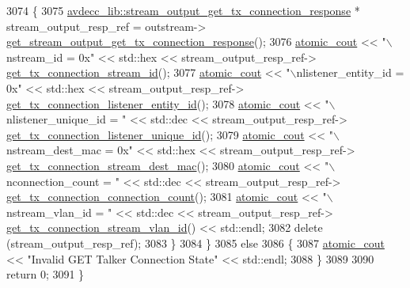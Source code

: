 \begin{DoxyCode}
3074         \{
3075             \hyperlink{classavdecc__lib_1_1stream__output__get__tx__connection__response}{avdecc\_lib::stream\_output\_get\_tx\_connection\_response}
       * stream\_output\_resp\_ref = outstream->
      \hyperlink{classavdecc__lib_1_1stream__output__descriptor_a802183ad18a965dc8540b3053ea875d4}{get\_stream\_output\_get\_tx\_connection\_response}();
3076             \hyperlink{cmd__line_8h_a0bc38ccc65c79ba06c6fcd7b4bf554c3}{atomic\_cout} << \textcolor{stringliteral}{"\(\backslash\)nstream\_id = 0x"} << std::hex << stream\_output\_resp\_ref->
      \hyperlink{classavdecc__lib_1_1stream__output__get__tx__connection__response_a41e8408f2d3675cf07e20f804cacbd4e}{get\_tx\_connection\_stream\_id}();
3077             \hyperlink{cmd__line_8h_a0bc38ccc65c79ba06c6fcd7b4bf554c3}{atomic\_cout} << \textcolor{stringliteral}{"\(\backslash\)nlistener\_entity\_id = 0x"} << std::hex << stream\_output\_resp\_ref->
      \hyperlink{classavdecc__lib_1_1stream__output__get__tx__connection__response_a01f0b3e593ca155a3312254e18123218}{get\_tx\_connection\_listener\_entity\_id}();
3078             \hyperlink{cmd__line_8h_a0bc38ccc65c79ba06c6fcd7b4bf554c3}{atomic\_cout} << \textcolor{stringliteral}{"\(\backslash\)nlistener\_unique\_id = "} << std::dec << stream\_output\_resp\_ref->
      \hyperlink{classavdecc__lib_1_1stream__output__get__tx__connection__response_a2f904ba7079c467dd2cbb6351d972a2e}{get\_tx\_connection\_listener\_unique\_id}();
3079             \hyperlink{cmd__line_8h_a0bc38ccc65c79ba06c6fcd7b4bf554c3}{atomic\_cout} << \textcolor{stringliteral}{"\(\backslash\)nstream\_dest\_mac = 0x"} << std::hex << stream\_output\_resp\_ref->
      \hyperlink{classavdecc__lib_1_1stream__output__get__tx__connection__response_a2530981730f87395de90a5c1bc09ceee}{get\_tx\_connection\_stream\_dest\_mac}();
3080             \hyperlink{cmd__line_8h_a0bc38ccc65c79ba06c6fcd7b4bf554c3}{atomic\_cout} << \textcolor{stringliteral}{"\(\backslash\)nconnection\_count = "} << std::dec << stream\_output\_resp\_ref->
      \hyperlink{classavdecc__lib_1_1stream__output__get__tx__connection__response_a6523c8f1c4608c93fcfc5fedbfd3a330}{get\_tx\_connection\_connection\_count}();
3081             \hyperlink{cmd__line_8h_a0bc38ccc65c79ba06c6fcd7b4bf554c3}{atomic\_cout} << \textcolor{stringliteral}{"\(\backslash\)nstream\_vlan\_id = "} << std::dec << stream\_output\_resp\_ref->
      \hyperlink{classavdecc__lib_1_1stream__output__get__tx__connection__response_a7f6acaf156e2a6e50cdfa1b9ea0e008e}{get\_tx\_connection\_stream\_vlan\_id}() << std::endl;
3082             \textcolor{keyword}{delete} (stream\_output\_resp\_ref);
3083         \}
3084     \}
3085     \textcolor{keywordflow}{else}
3086     \{
3087         \hyperlink{cmd__line_8h_a0bc38ccc65c79ba06c6fcd7b4bf554c3}{atomic\_cout} << \textcolor{stringliteral}{"Invalid GET Talker Connection State"} << std::endl;
3088     \}
3089 
3090     \textcolor{keywordflow}{return} 0;
3091 \}
\end{DoxyCode}


